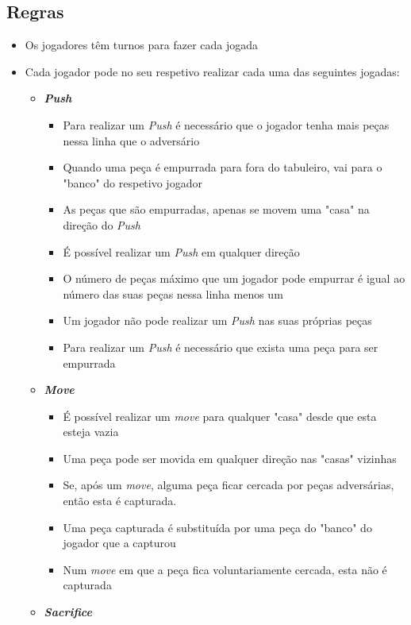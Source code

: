 \documentclass[a4paper]{article}
\begin{document}
\subsection{Regras}

\begin{itemize}
	\item Os jogadores têm turnos para fazer cada jogada
	\item Cada jogador pode no seu respetivo realizar cada uma das seguintes jogadas:
			\begin{itemize}
				\item[] \textbf{\textit{Push}}
				\begin{itemize}
					\item Para realizar um \textit{Push} é necessário que o jogador tenha mais peças nessa linha que o adversário
					\item Quando uma peça é empurrada para fora do tabuleiro, vai para o "banco" do respetivo jogador
					\item As peças que são empurradas, apenas se movem uma "casa" na direção do \textit{Push}
					\item É possível realizar um \textit{Push} em qualquer direção
					\item O número de peças máximo que um jogador pode empurrar é igual ao número das suas peças nessa linha menos um
					\item Um jogador não pode realizar um \textit{Push} nas suas próprias peças
					\item Para realizar um \textit{Push} é necessário que exista uma peça para ser empurrada
				\end{itemize}
				\item[] \textbf{\textit{Move}}
				\begin{itemize}
					\item É possível realizar um \textit{move} para qualquer "casa" desde que esta esteja vazia
					\item Uma peça pode ser movida em qualquer direção nas "casas" vizinhas
					\item Se, após um \textit{move}, alguma peça ficar cercada por peças adversárias, então esta é capturada.
					\item Uma peça capturada é substituída por uma peça do "banco" do jogador que a capturou
					\item Num \textit{move} em que a peça fica voluntariamente cercada, esta não é capturada
				\end{itemize}
				\item[] \textbf{\textit{Sacrifice}}

\end{itemize}
\end{itemize}
\end{document}

